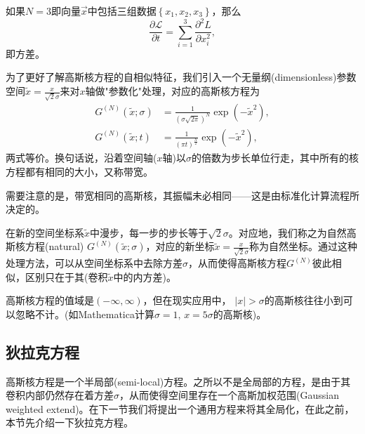 \begin{subappendices}
如果$N=3$即向量$\vec{x}$中包括三组数据$\left\{x_{1},x_{2},x_{3}\right\}$，那么
\begin{equation*}
  \frac{\partial \mathcal{L}}{\partial t} = \sum_{i=1}^{3} \frac{\partial^{2} L}{\partial x_{i}^{2}},
\end{equation*}
即方差。


为了更好了解高斯核方程的自相似特征，我们引入一个无量纲(dimensionless)参数空间$\tilde{x} = \frac{x}{ \sqrt{2} \sigma}$来对$x$轴做"参数化"处理，对应的高斯核方程为
\begin{equation*}
\begin{split}
    G^{(N)} \left( \tilde{x}; \sigma \right) & = \frac{1}{\left( \sigma \sqrt{2 \pi} \right)^{N}} \exp \left( - \tilde{x}^{2} \right), \\
    G^{(N)} \left( \tilde{x}; t \right) & =
    \frac{1}{\left(\pi t\right)^{\frac{N}{2}}} \exp \left( - \tilde{x}^{2} \right),
\end{split}
\end{equation*}
两式等价。换句话说，沿着空间轴($x$轴)以$\sigma$的倍数为步长单位行走，其中所有的核方程都有相同的大小，又称带宽。

需要注意的是，带宽相同的高斯核，其振幅未必相同——这是由标准化计算流程所决定的。

在新的空间坐标系$\tilde{x}$中漫步，每一步的步长等于$\sqrt{2} \sigma$。对应地，我们称之为自然高斯核方程(natural) $G^{(N)} \left( \tilde{x} ; \sigma \right)$，对应的新坐标$\tilde{x} = \frac{x}{\sqrt{2} \sigma}$称为自然坐标。通过这种处理方法，可以从空间坐标系中去除方差$\sigma$，从而使得高斯核方程$G^{(N)}$彼此相似，区别只在于其(卷积$\tilde{x}$中的内方差)。

高斯核方程的值域是$\left( - \infty, \infty \right)$，但在现实应用中， $\left| x \right| > \sigma$的高斯核往往小到可以忽略不计。(如Mathematica计算$\sigma = 1, \, x = 5 \sigma$的高斯核)。

\subsection{狄拉克方程}
\label{sec:kernel-gaussian-dirac}
高斯核方程是一个半局部(semi-local)方程。之所以不是全局部的方程，是由于其卷积内部仍然存在着方差$\sigma$，从而使得空间里存在一个高斯加权范围(Gaussian weighted extend)。在下一节我们将提出一个通用方程来将其全局化，在此之前，本节先介绍一下狄拉克方程。


\end{subappendices}
